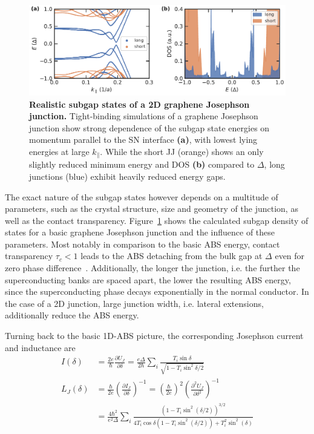 \begin{figure}[t]
	\centering
	\includegraphics[width=\linewidth]{chapter-introduction/figs/kwant_modeling_181206_subgap_length_supp_Plot_subgap_dos}
	\caption{
		\textbf{Realistic subgap states of a 2D graphene Josephson junction.}
		Tight-binding simulations of a graphene Josephson junction show strong dependence of the subgap state energies on momentum parallel to the SN interface \textbf{(a)}, with lowest lying energies at large $k_\parallel$.
		While the short JJ (orange) shows an only slightly reduced minimum energy and DOS \textbf{(b)} compared to $\Delta$, long junctions (blue) exhibit heavily reduced energy gaps.
	}
	\label{fig:modelsubgap}
\end{figure}

The exact nature of the subgap states however depends on a multitude of parameters, such as the crystal structure, size and geometry of the junction, as well as the contact transparency.
%
Figure~\ref{fig:modelsubgap} shows the calculated subgap density of states for a basic graphene Josephson junction and the influence of these parameters.
%
Most notably in comparison to the basic ABS energy, contact transparency $\tau_c<1$ leads to the ABS detaching from the bulk gap at $\Delta$ even for zero phase difference~\cite{bretheauTunnellingSpectroscopyAndreev2017a}.
%
Additionally, the longer the junction, i.e. the further the superconducting banks are spaced apart, the lower the resulting ABS energy, since the superconducting phase decays exponentially in the normal conductor.
%
In the case of a 2D junction, large junction width, i.e. lateral extensions, additionally reduce the ABS energy.




Turning back to the basic 1D-ABS picture, the corresponding Josephson current and inductance are 
\begin{align}
I(\delta) &= \frac{2e}{\hbar}\frac{\partial U_J}{\partial\delta} = \frac{e\Delta}{2\hbar}\sum_i\frac{T_i\sin\delta}{\sqrt{1-T_i\sin^2\delta/2}} \\
L_J(\delta) &= \frac{\hbar}{2e}\left( \frac{\partial I_J}{\partial\delta} \right)^{-1} = \left(\frac{\hbar}{2e}\right)^2\left(\frac{\partial^2U_J}{\partial\delta^2}\right)^{-1} \\
&= \frac{4\hbar^2}{e^2\Delta}\sum_i \frac{\left(1-T_i\sin^2(\delta/2)\right)^{3/2}}{4T_i\cos\delta\left(1-T_i\sin^2(\delta/2)\right)+T_i^2\sin^2(\delta)}
\end{align}

